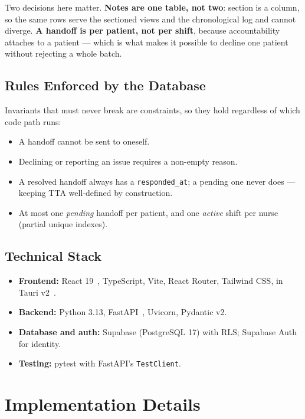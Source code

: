 \documentclass{tietreport}
\begin{document}
Two decisions here matter. \textbf{Notes are one table, not
two}: section is a column, so the same rows serve the
sectioned views and the chronological log and cannot
diverge. \textbf{A handoff is per patient, not per shift},
because accountability attaches to a patient --- which is
what makes it possible to decline one patient without
rejecting a whole batch.

\subsection{Rules Enforced by the Database}

Invariants that must never break are constraints, so they
hold regardless of which code path runs:

\begin{itemize}
  \item A handoff cannot be sent to oneself.
  \item Declining or reporting an issue requires a non-empty
    reason.
  \item A resolved handoff always has a
    \texttt{responded\_at}; a pending one never does ---
    keeping TTA well-defined by construction.
  \item At most one \emph{pending} handoff per patient, and
    one \emph{active} shift per nurse (partial unique
    indexes).
\end{itemize}

\subsection{Technical Stack}

\begin{itemize}
  \item \textbf{Frontend:} React 19~\cite{react},
    TypeScript, Vite, React Router, Tailwind CSS, in Tauri
    v2~\cite{tauri}.
  \item \textbf{Backend:} Python 3.13,
    FastAPI~\cite{fastapi}, Uvicorn, Pydantic v2.
  \item \textbf{Database and auth:} Supabase (PostgreSQL 17)
    with RLS; Supabase Auth for identity.
  \item \textbf{Testing:} pytest with FastAPI's
    \texttt{TestClient}.
\end{itemize}

\section{Implementation Details}
\end{document}
